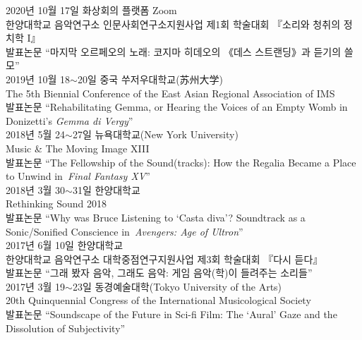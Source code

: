\documentclass[a4paper,10pt,draft]{article}
\begin{document}
  \noindent 2020년 10월 17일 화상회의 플랫폼 Zoom\\
  한양대학교 음악연구소 인문사회연구소지원사업 제1회 학술대회 『소리와 청취의 정치학 I』\\
  발표논문 “마지막 오르페오의 노래: 코지마 히데오의 《데스 스트랜딩》과 듣기의 쓸모”\\
  
  \noindent 2019년 10월 18$\sim$20일 중국 쑤저우대학교(苏州大学)\\    
  The 5th Biennial Conference of the East Asian Regional Association of IMS\\
  발표논문 “Rehabilitating Gemma, or Hearing the Voices of an Empty Womb in Donizetti’s \textit{Gemma di Vergy}”\\
  
  
  \noindent 2018년 5월 24$\sim$27일 뉴욕대학교(New York University)\\
  Music \& The Moving Image XIII\\
  발표논문 “The Fellowship of the Sound(tracks): How the Regalia Became a Place to Unwind in \textit{Final Fantasy XV}”\\
  
  \noindent 2018년 3월 30$\sim$31일 한양대학교\\
  Rethinking Sound 2018\\
  발표논문 “Why was Bruce Listening to ‘Casta diva’? Soundtrack as a Sonic/Sonified Conscience in \textit{Avengers: Age of Ultron}”\\
  
  \noindent 2017년 6월 10일 한양대학교\\
  한양대학교 음악연구소 대학중점연구지원사업 제3회 학술대회 『다시 듣다』\\
  발표논문 “그래 봤자 음악, 그래도 음악: 게임 음악(학)이 들려주는 소리들”\\
  
  \noindent 2017년 3월 19$\sim$23일 동경예술대학(Tokyo University of the Arts)\\
  20th Quinquennial Congress of the International Musicological Society\\
  발표논문 “Soundscape of the Future in Sci-fi Film: The ‘Aural’ Gaze and the Dissolution of Subjectivity”\\
  
\end{document}

